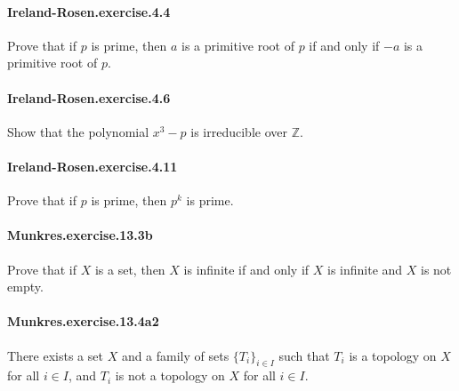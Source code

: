 \documentclass{article}
\begin{document}
\paragraph{Ireland-Rosen.exercise.4.4} Prove that if $p$ is prime, then $a$ is a primitive root of $p$ if and only if $-a$ is a primitive root of $p$.

\paragraph{Ireland-Rosen.exercise.4.6} Show that the polynomial $x^3 - p$ is irreducible over $\mathbb{Z}$.

\paragraph{Ireland-Rosen.exercise.4.11} Prove that if $p$ is prime, then $p^k$ is prime.



\paragraph{Munkres.exercise.13.3b} Prove that if $X$ is a set, then $X$ is infinite if and only if $X$ is infinite and $X$ is not empty.

\paragraph{Munkres.exercise.13.4a2} There exists a set $X$ and a family of sets $\{T_i\}_{i\in I}$ such that $T_i$ is a topology on $X$ for all $i\in I$, and $T_i$ is not a topology on $X$ for all $i\in I$.

\end{document}

